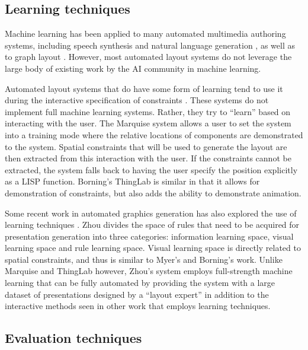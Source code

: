    \subsection{Learning techniques}
    \label{learning-techniques}

    Machine learning has been applied to many automated multimedia authoring
    systems, including speech synthesis \citep{pan-1} and natural language
    generation \citep{kamimura-1}, as well as to graph layout \citep{masui-1}.
    However, most automated layout systems do not leverage the large body of
    existing work by the AI community in machine learning.

    Automated layout systems that do have some form of learning tend to use it
    during the interactive specification of constraints
    \citep{myers-1,borning-1}. These systems do not implement full machine
    learning systems. Rather, they try to “learn” based on interacting with the
    user. The Marquise system \citep{myers-1} allows a user to set the system
    into a training mode where the relative locations of components are
    demonstrated to the system. Spatial constraints that will be used to
    generate the layout are then extracted from this interaction with the user.
    If the constraints cannot be extracted, the system falls back to having the
    user specify the position explicitly as a LISP function. Borning’s
    \citep{borning-1} ThingLab is similar in that it allows for demonstration
    of constraints, but also adds the ability to demonstrate animation.

    Some recent work in automated graphics generation has also explored the use of learning techniques \citep{zhou-3}. Zhou divides the space of rules that need to be acquired for presentation generation into three categories: information learning space, visual learning space and rule learning space. Visual learning space is directly related to spatial constraints, and thus is similar to Myer’s and Borning’s work. Unlike Marquise and ThingLab however, Zhou’s system employs full-strength machine learning that can be fully automated by providing the system with a large dataset of presentations designed by a “layout expert” in addition to the interactive methods seen in other work that employs learning techniques.

   \subsection{Evaluation techniques}
    \label{evaluation-techniques}

